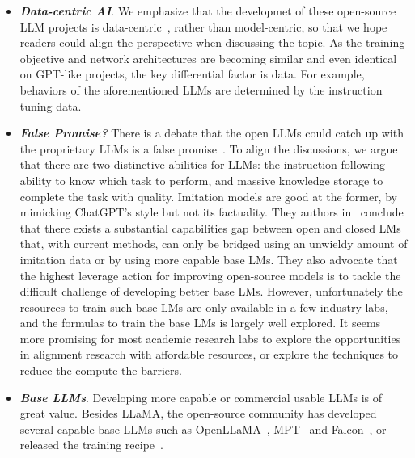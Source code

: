 \documentclass{article}
\begin{document}
\begin{itemize}[leftmargin=7.5mm]
\setlength{\itemsep}{2pt}
\item 
{\bf \it Data-centric AI}. We emphasize that the developmet of these open-source LLM projects is data-centric~\cite{mazumder2022dataperf}, rather than model-centric, so that we hope readers could align the perspective when discussing the topic. As the training objective and network architectures are becoming similar and even identical on GPT-like projects, the key differential factor is data. For example, behaviors of the aforementioned LLMs are determined by the instruction tuning data. 

\item
{\bf \it False Promise?} There is a debate that the open LLMs could catch up with the proprietary LLMs is a false promise~\cite{gudibande2023false}. 
To align the discussions, we argue that there are two distinctive abilities for LLMs: the instruction-following ability to know which task to perform, and massive knowledge storage to complete the task with quality. Imitation models are good at the former, by mimicking ChatGPT's style but not its factuality. They authors in~\cite{gudibande2023false} conclude that there exists a substantial capabilities gap between open and closed LMs that, with current methods, can only be bridged using an unwieldy amount of imitation data or by using more capable base LMs. They also advocate that the highest leverage action for improving open-source models is to tackle the difficult challenge of developing better base LMs. However, unfortunately the resources to train such base LMs are only available in a few industry labs, and the formulas to train the base LMs is largely well explored. It seems more promising for most academic research labs to explore the opportunities in alignment research with affordable resources, or explore the techniques to reduce the compute the barriers.

\item
{\bf \it Base LLMs}. Developing more capable or commercial usable LLMs is of great value. Besides LLaMA, the open-source community has developed several capable base LLMs such as OpenLLaMA~\citep{openlm2023openllama}, MPT~\citep{MosaicML2023Introducing} and Falcon~\citep{refinedweb}, or released the training recipe~\citep{together2023redpajama}.
\end{itemize}



\pagebreak
\newpage
\end{document}

